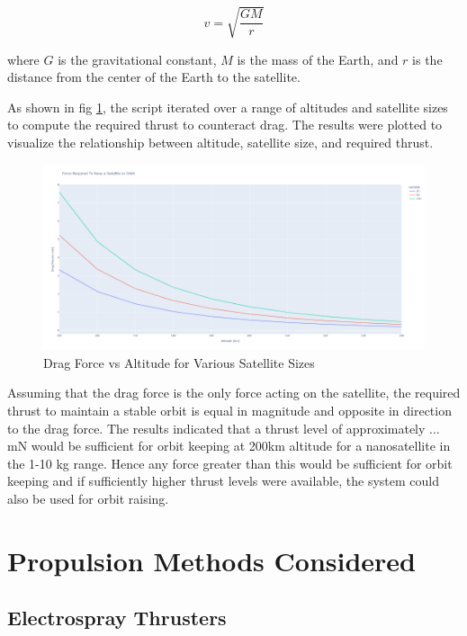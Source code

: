 \begin{equation}
    v = \sqrt{\frac{GM}{r}}
\end{equation}

where \( G \) is the gravitational constant, \( M \) is the mass of the Earth, and \( r \) is the distance from the center of the Earth to the satellite.


As shown in fig \ref{fig:drag_force_vs_altitude}, the script iterated over a range of altitudes and satellite sizes to compute the required thrust to counteract drag. The results were plotted to visualize the relationship between altitude, satellite size, and required thrust.

\begin{figure}[H]
    \centering
    \includegraphics[width=1.0\textwidth]{images/Misc/150km - 240km.png}
    \caption{Drag Force vs Altitude for Various Satellite Sizes}
    \label{fig:drag_force_vs_altitude}
\end{figure}

Assuming that the drag force is the only force acting on the satellite, the required thrust to maintain a stable orbit is equal in magnitude and opposite in direction to the drag force. The results indicated that a thrust level of approximately ... mN would be sufficient for orbit keeping at 200km altitude for a nanosatellite in the 1-10 kg range. Hence any force greater than this would be sufficient for orbit keeping and if sufficiently higher thrust levels were available, the system could also be used for orbit raising.

\section{Propulsion Methods Considered}

\subsection{Electrospray Thrusters}

